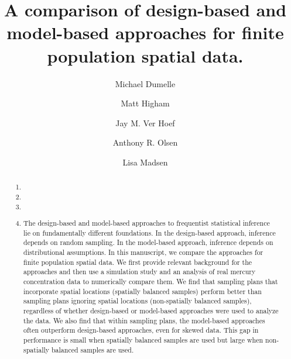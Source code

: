 \documentclass[]{elsarticle} %
\begin{document}
\begin{frontmatter}

  \title{A comparison of design-based and model-based approaches for finite
population spatial data.}
    \author[USEPA]{Michael Dumelle}
  
    \author[STLAW]{Matt Higham}
  
    \author[NOAA]{Jay M. Ver Hoef}
  
    \author[USEPA]{Anthony R. Olsen}
  
    \author[OSU]{Lisa Madsen}
  
      \address[USEPA]{United States Environmental Protection Agency, 200 SW 35th St,
Corvallis, Oregon, 97333}
    \address[STLAW]{Saint Lawrence University Department of Mathematics, Computer Science,
and Statistics, 23 Romoda Drive, Canton, New York, 13617}
    \address[NOAA]{Marine Mammal Laboratory, Alaska Fisheries Science Center, National
Oceanic and Atmospheric Administration, Seattle, Washington, 98115}
    \address[OSU]{Oregon State University Department of Statistics, 239 Weniger Hall,
Corvallis, Oregon, 97331}
  
  \begin{abstract}
  \begin{enumerate}
  \def\labelenumi{\arabic{enumi}.}
  \item
  \item
  \item
  \item
    The design-based and model-based approaches to frequentist statistical
    inference lie on fundamentally different foundations. In the
    design-based approach, inference depends on random sampling. In the
    model-based approach, inference depends on distributional assumptions.
    In this manuscript, we compare the approaches for finite population
    spatial data. We first provide relevant background for the approaches
    and then use a simulation study and an analysis of real mercury
    concentration data to numerically compare them. We find that sampling
    plans that incorporate spatial locations (spatially balanced samples)
    perform better than sampling plans ignoring spatial locations
    (non-spatially balanced samples), regardless of whether design-based
    or model-based approaches were used to analyze the data. We also find
    that within sampling plans, the model-based approaches often
    outperform design-based approaches, even for skewed data. This gap in
    performance is small when spatially balanced samples are used but
    large when non-spatially balanced samples are used.
  \end{enumerate}
  \end{abstract}
  
 \end{frontmatter}
\end{document}
